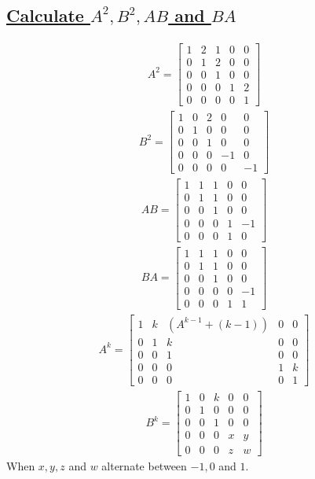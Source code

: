 \documentclass[a4paper, 12pt]{article}
\newcommand{\sub}[1]{\subsection{\underline{#1}}}
\newcommand{\eq}[1]{\begin{align*}#1\end{align*}}
\begin{document}
\begin{titlepage}
    
\end{titlepage}

\setcounter{section}{1}
\section{}
\sub{Calculate $A^2, B^2, AB$ and $BA$}
\eq{
    A^2=\begin{bmatrix}
        1&2&1&0&0\\
        0&1&2&0&0\\
        0&0&1&0&0\\
        0&0&0&1&2\\
        0&0&0&0&1
    \end{bmatrix}
}
\eq{
    B^2=\begin{bmatrix}
        1&0&2&0&0\\
        0&1&0&0&0\\
        0&0&1&0&0\\
        0&0&0&-1&0\\
        0&0&0&0&-1
    \end{bmatrix}
}
\eq{
    AB=\begin{bmatrix}
        1&1&1&0&0\\
        0&1&1&0&0\\
        0&0&1&0&0\\
        0&0&0&1&-1\\
        0&0&0&1&0
    \end{bmatrix}
}
\eq{
    BA=\begin{bmatrix}
        1&1&1&0&0\\
        0&1&1&0&0\\
        0&0&1&0&0\\
        0&0&0&0&-1\\
        0&0&0&1&1
    \end{bmatrix}
}
\eq{
    A^k=\begin{bmatrix}
        1&k&(A^{k-1}+(k-1))&0&0\\
        0&1&k&0&0\\
        0&0&1&0&0\\
        0&0&0&1&k\\
        0&0&0&0&1
    \end{bmatrix}
}
\eq{
    B^k=\begin{bmatrix}
        1&0&k&0&0\\
        0&1&0&0&0\\
        0&0&1&0&0\\
        0&0&0&x&y\\
        0&0&0&z&w
    \end{bmatrix}
}
When $x,y,z$ and $w$ alternate between $-1, 0$ and $1$.
\pagebreak
\end{document}

